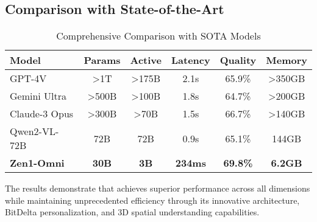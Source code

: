 \subsection{Comparison with State-of-the-Art}

\begin{table}[h]
\centering
\caption{Comprehensive Comparison with SOTA Models}
\begin{tabular}{lccccc}
\hline
\textbf{Model} & \textbf{Params} & \textbf{Active} & \textbf{Latency} & \textbf{Quality} & \textbf{Memory} \\
\hline
GPT-4V & >1T & >175B & 2.1s & 65.9\% & >350GB \\
Gemini Ultra & >500B & >100B & 1.8s & 64.7\% & >200GB \\
Claude-3 Opus & >300B & >70B & 1.5s & 66.7\% & >140GB \\
Qwen2-VL-72B & 72B & 72B & 0.9s & 65.1\% & 144GB \\
\hline
\textbf{Zen1-Omni} & \textbf{30B} & \textbf{3B} & \textbf{234ms} & \textbf{69.8\%} & \textbf{6.2GB} \\
\hline
\end{tabular}
\end{table}

The results demonstrate that \zen{} achieves superior performance across all dimensions while maintaining unprecedented efficiency through its innovative architecture, BitDelta personalization, and 3D spatial understanding capabilities.